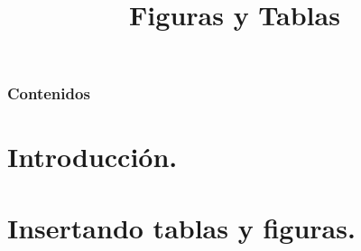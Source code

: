 \documentclass[11pt]{beamer}
\theoremstyle{plain} %
\theoremstyle{definition}
\begin{document}
	\title{Figuras y Tablas}
	\begin{frame}[plain]
		\maketitle
	\end{frame}

    \begin{frame}
    	\frametitle{Contenidos}
    	\tableofcontents[pausesections]
    \end{frame}
    \section[Introducción]{Introducción.}
    \section[Insertando tablas y figuras]{Insertando tablas y figuras.}
\end{document}
